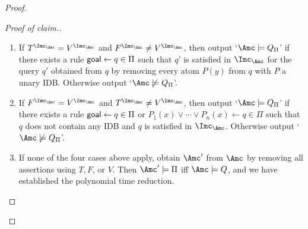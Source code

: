 \documentclass{lmcs}
\theoremstyle{definition}
\let\OriginalQedSymbol\qedsymbol
\renewcommand{\qedsymbol}{\OriginalQedSymbol\setcounter{claim}{0}}
\let\NormalQedSymbol\qedsymbol
\newenvironment{clmproof}[1]{\renewcommand{\qedsymbol}{$\dashv$}\begin{proof}[Proof of claim.]\space#1}{\end{proof}\renewcommand{\qedsymbol}{\NormalQedSymbol}}
\begin{document}
\begin{proof}
\begin{clmproof}
\begin{enumerate}
\item If $T^{\Imc_{\Amc}}=V^{\Imc_{\Amc}}$ and $F^{\Imc_{\Amc}}\not=V^{\Imc_{\Amc}}$, then output `$\Amc\models Q_{\Pi}$' if there exists a rule ${\sf goal}\leftarrow q\in \Pi$ 
such that $q'$ is satisfied in $\Imc_{\Amc}$ for the query $q'$ obtained from $q$ by removing every atom $P(y)$ from $q$ with $P$ a unary IDB. 
Otherwise output `$\Amc\not\models Q_{\Pi}$'. 
\item If $F^{\Imc_{\Amc}}=V^{\Imc_{\Amc}}$ and $T^{\Imc_{\Amc}}\not=V^{\Imc_{\Amc}}$, then output `$\Amc\models Q_{\Pi}$' if there exists a rule 
${\sf goal}\leftarrow q\in \Pi$ or $P_{1}(x)\vee \cdots \vee P_{n}(x) \leftarrow q\in \Pi$ such that $q$ does not contain
any IDB and $q$ is satisfied in $\Imc_{\Amc}$. Otherwise output `$\Amc\not\models Q_{\Pi}$'.
\item If none of the four cases above apply, obtain $\Amc'$ from $\Amc$ by removing all assertions using $T,F$, or $V$. 
Then $\Amc'\models \Pi$ iff $\Amc\models Q$, and we have established the polynomial time reduction. \qedhere
\end{enumerate}
\end{clmproof}


\end{proof}
\end{document}
